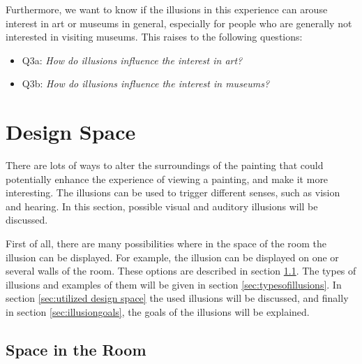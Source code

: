 \documentclass[a4paper]{article}
\begin{document}
Furthermore, we want to know if the illusions in this experience can arouse interest in art or museums in general, especially for people who are generally not interested in visiting museums. This raises to the following questions:

\begin{itemize}
\item{Q3a: \emph{How do illusions influence the interest in art?}}
\item{Q3b: \emph{How do illusions influence the interest in museums?}}

\end{itemize}



\section{Design Space}\label{design space}

There are lots of ways to alter the surroundings of the painting that could potentially enhance the experience of viewing a painting, and make it more interesting. The illusions can be used to trigger different senses, such as vision and hearing. In this section, possible visual and auditory illusions will be discussed.

First of all, there are many possibilities where in the space of the room the illusion can be displayed. For example, the illusion can be displayed on one or several walls of the room. These options are described in section \ref{sec:spaceinroom}. The types of illusions and examples of them will be given in section \ref{sec:typesofillusions}. In section \ref{sec:utilized design space} the used illusions will be discussed, and finally in section \ref{sec:illusiongoals}, the goals of the illusions will be explained. 





\subsection{Space in the Room}\label{sec:spaceinroom}
\end{document}
